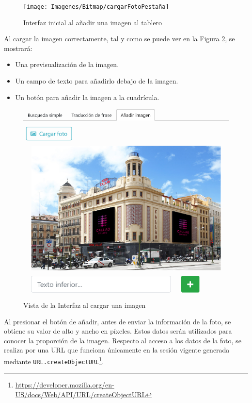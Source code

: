 \begin{figure}[h!]
	\centering
	\texttt{[image: Imagenes/Bitmap/cargarFotoPestaña]}
	\caption{Interfaz inicial al añadir una imagen al tablero}
	\label{fig:cargarfotopestana}
\end{figure}


Al cargar la imagen correctamente, tal y como se puede ver en la Figura \ref{fig:addphotoitem}, se mostrará: 

\begin{itemize}
	\item Una previsualización de la imagen.
	\item Un campo de texto para añadirlo debajo de la imagen.
	\item Un botón para añadir la imagen a la cuadrícula.
\end{itemize}

\begin{figure}[h!]
	\centering
	\includegraphics[width=0.7\linewidth]{Imagenes/Bitmap/addPhotoItem}
	\caption{ Vista de la Interfaz al cargar una imagen}
	\label{fig:addphotoitem}
\end{figure}



Al presionar el botón de añadir, antes de enviar la información de la foto, se obtiene su valor de alto y ancho en píxeles. Estos datos serán utilizados para conocer la proporción de la imagen. Respecto al acceso a los datos de la foto, se realiza por una URL que funciona únicamente en la sesión vigente generada mediante \texttt{URL.createObjectURL}\footnote{\url{https://developer.mozilla.org/en-US/docs/Web/API/URL/createObjectURL}}.

